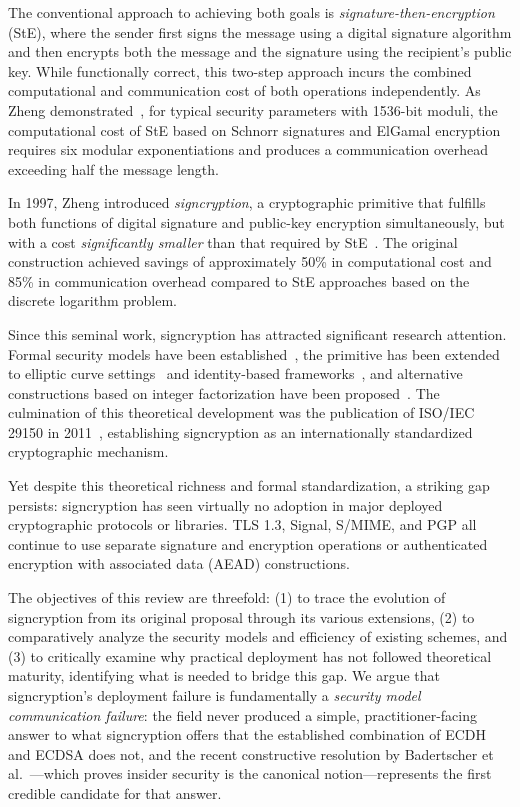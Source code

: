 \documentclass[conference]{IEEEtran}
\begin{document}
The conventional approach to achieving both goals is \textit{signature-then-encryption} (StE), where the sender first signs the message using a digital signature algorithm and then encrypts both the message and the signature using the recipient's public key. While functionally correct, this two-step approach incurs the combined computational and communication cost of both operations independently. As Zheng demonstrated~\cite{zheng1997}, for typical security parameters with 1536-bit moduli, the computational cost of StE based on Schnorr signatures and ElGamal encryption requires six modular exponentiations and produces a communication overhead exceeding half the message length.

In 1997, Zheng introduced \textit{signcryption}, a cryptographic primitive that fulfills both functions of digital signature and public-key encryption simultaneously, but with a cost \textit{significantly smaller} than that required by StE~\cite{zheng1997}. The original construction achieved savings of approximately 50\% in computational cost and 85\% in communication overhead compared to StE approaches based on the discrete logarithm problem.

Since this seminal work, signcryption has attracted significant research attention. Formal security models have been established~\cite{baek2002, an2002, baek2007}, the primitive has been extended to elliptic curve settings~\cite{zheng1998} and identity-based frameworks~\cite{malonelee2002, boyen2003}, and alternative constructions based on integer factorization have been proposed~\cite{steinfeld2000}. The culmination of this theoretical development was the publication of ISO/IEC 29150 in 2011~\cite{iso29150}, establishing signcryption as an internationally standardized cryptographic mechanism.

Yet despite this theoretical richness and formal standardization, a striking gap persists: signcryption has seen virtually no adoption in major deployed cryptographic protocols or libraries. TLS 1.3, Signal, S/MIME, and PGP all continue to use separate signature and encryption operations or authenticated encryption with associated data (AEAD) constructions.

The objectives of this review are threefold: (1) to trace the evolution of signcryption from its original proposal through its various extensions, (2) to comparatively analyze the security models and efficiency of existing schemes, and (3) to critically examine why practical deployment has not followed theoretical maturity, identifying what is needed to bridge this gap. We argue that signcryption's deployment failure is fundamentally a \textit{security model communication failure}: the field never produced a simple, practitioner-facing answer to what signcryption offers that the established combination of ECDH and ECDSA does not, and the recent constructive resolution by Badertscher et al.~\cite{badertscher2018}---which proves insider security is the canonical notion---represents the first credible candidate for that answer.
\end{document}
